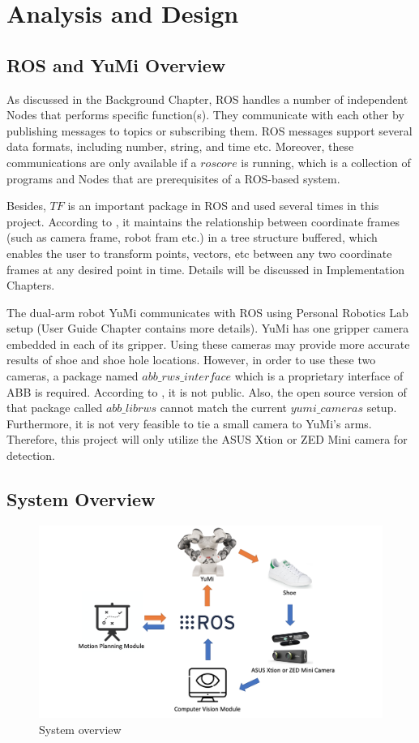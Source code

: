\chapter{Analysis and Design}

\section{ROS and YuMi Overview}
As discussed in the Background Chapter, ROS handles a number of independent Nodes that performs specific function(s). They communicate with each other by publishing messages to topics or subscribing them. ROS messages support several data formats, including number, string, and time etc. Moreover, these communications are only available if a $roscore$ is running, which is a collection of programs and Nodes that are prerequisites of a ROS-based system.

Besides, $TF$ is an important package in ROS and used several times in this project. According to \citep{tfROSWik}, it maintains the relationship between coordinate frames (such as camera frame, robot fram etc.) in a tree structure buffered, which enables the user to transform points, vectors, etc between any two coordinate frames at any desired point in time. Details will be discussed in Implementation Chapters.

The dual-arm robot YuMi communicates with ROS using Personal Robotics Lab setup (User Guide Chapter contains more details). YuMi has one gripper camera embedded in each of its gripper. Using these cameras may provide more accurate results of shoe and shoe hole locations. However, in order to use these two cameras, a package named $abb\_rws\_interface$ which is a proprietary interface of ABB is required. According to \citep{EGMfiles}, it is not public. Also, the open source version of that package called $abb\_librws$ cannot match the current $yumi\_cameras$ setup. Furthermore, it is not very feasible to tie a small camera to YuMi's arms. Therefore, this project will only utilize the ASUS Xtion or ZED Mini camera for detection.

\section{System Overview}

\begin{figure}[H]
\centering
\includegraphics[width = \columnwidth]{AnalysisDesign/system.png}
\caption{System overview}
\label{c4}
\end{figure}

